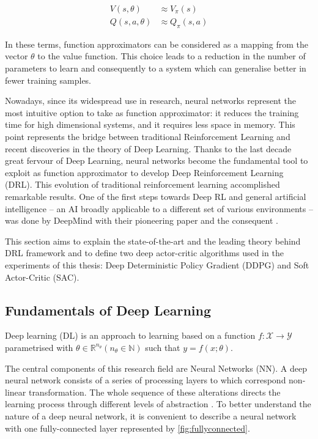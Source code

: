 \begin{equation}\label{eq:fun_appr}
\begin{aligned}
V(s, \theta) &\approx V_\pi(s) \\
Q(s, a, \theta) &\approx Q_\pi(s,a)
\end{aligned}	
\end{equation}

In these terms, function approximators can be considered as a mapping from the vector $\theta$ to the value function.
This choice leads to a reduction in the number of parameters to learn and consequently to a system which can generalise better in fewer training samples.

Nowadays, since its widespread use in research, neural networks represent the most intuitive option to take as function approximator: it reduces the training time for high dimensional systems, and it requires less space in memory.
This point represents the bridge between traditional Reinforcement Learning and recent discoveries in the theory of Deep Learning. 
Thanks to the last decade great fervour of Deep Learning, neural networks become the fundamental tool to exploit as function approximator to develop Deep Reinforcement Learning (DRL). This evolution of traditional reinforcement learning accomplished remarkable results. One of the first steps towards Deep RL and general artificial intelligence -- an AI broadly applicable to a different set of various environments -- was done by DeepMind with their pioneering paper \cite{mnih2013playing} and the consequent \cite{mnih2015human}.

This section aims to explain the state-of-the-art and the leading theory behind DRL framework and to define two deep actor-critic algorithms used in the experiments of this thesis: Deep Deterministic Policy Gradient (DDPG) and Soft Actor-Critic (SAC).

\subsection{Fundamentals of Deep Learning}

Deep learning (DL) is an approach to learning based on a function $f: \mathcal{X} \rightarrow \mathcal{Y}$ parametrised with $\theta \in \mathbb{R}^{n_\theta} (n_\theta \in \mathbb{N})$ such that $y = f(x;\theta)$.

The central components of this research field are Neural Networks (NN).
A deep neural network consists of a series of processing layers to which correspond non-linear transformation.
The whole sequence of these alterations directs the learning process through different levels of abstraction \cite{erhan2009visualizing}.
To better understand the nature of a deep neural network, it is convenient to describe a neural network with one fully-connected layer represented by \vref{fig:fullyconnected}. 

